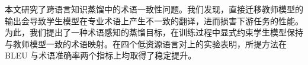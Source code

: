 本文研究了跨语言知识蒸馏中的术语一致性问题。我们发现，直接迁移教师模型的输出会导致学生模型在专业术语上产生不一致的翻译，进而损害下游任务的性能。为此，我们提出了一种术语感知的蒸馏目标，在训练过程中显式约束学生模型保持与教师模型一致的术语映射。在四个低资源语言对上的实验表明，所提方法在 BLEU 与术语准确率两个指标上均取得了稳定提升。
